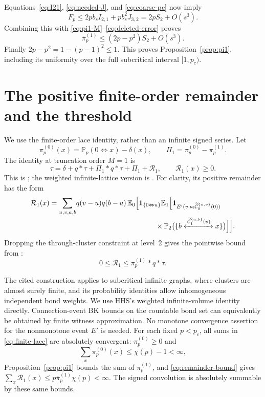 \documentclass[11pt]{article}
\theoremstyle{definition}
\newcommand{\Pp}{\mathbb P_p}
\newcommand{\ind}{\mathbf 1}
\newcommand{\through}[3]{\{#1\xleftrightarrow{\,#3\,}#2\}}
\begin{document}
Equations~\eqref{eq:I21}, \eqref{eq:needed-J}, and
\eqref{eq:coarse-pc} now imply
\[
 F_p\le2p b_s I_{2,1}+p b_s^2J_{3,2}
      =2pS_2+O(s^3).
\]
Combining this with \eqref{eq:pi1-M}--\eqref{eq:deleted-error} proves
\[
 \overline\pi_p^{(1)}\le(2p-p^2)S_2+O(s^3).
\]
Finally $2p-p^2=1-(p-1)^2\le1$. This proves
Proposition~\ref{prop:pi1}, including its uniformity over the full
subcritical interval $[1,p_c)$.

\section{The positive finite-order remainder and the threshold}
\label{sec:threshold}

We use the finite-order lace identity, rather than an infinite signed
series. Let
\[
 \pi_p^{(0)}(x)=\Pp(0\Leftrightarrow x)-\delta(x),\qquad
 \Pi_1=\pi_p^{(0)}-\pi_p^{(1)}.
\]
The identity at truncation order $M=1$ is
\begin{equation}\label{eq:finite-lace}
 \tau=\delta+q*\tau+\Pi_1*q*\tau+\Pi_1+\mathcal R_1,
 \qquad \mathcal R_1(x)\ge0.
\end{equation}
This is \cite[(3.9)--(3.10), (3.32)]{BCHSS2005}; the weighted
infinite-lattice version is \cite[Section~4.2, (4.6)]{HHS2008}.
For clarity, its positive remainder has the form
\begin{align}\label{eq:remainder-positive}
 \mathcal R_1(x)
 =\sum_{u,v,a,b}&q(v-u)q(b-a)\,
 \mathbb E_0\Big[\ind_{\{0\Leftrightarrow u\}}
 \mathbb E_1\Big[\ind_{E'(v,a;\widetilde{\mathcal C}_0^{\{u,v\}}(0))}
 \notag\\[-2pt]
 &\hspace{39mm}\times
 \mathbb P_2\big(\through{b}{x}{\widetilde{\mathcal C}_1^{\{a,b\}}(v)}\big)
 \Big]\Big].
\end{align}
Dropping the through-cluster constraint at level~2 gives the pointwise
bound from \cite[(3.36)]{BCHSS2005}:
\begin{equation}\label{eq:remainder-bound}
 0\le\mathcal R_1\le\pi_p^{(1)}*q*\tau.
\end{equation}

The cited construction applies to subcritical infinite graphs, where
clusters are almost surely finite, and its probability identities allow
inhomogeneous independent bond weights. We use HHS's weighted
infinite-volume identity directly. Connection-event BK bounds on the
countable bond set can equivalently be obtained by finite witness
approximation. No monotone convergence assertion for the nonmonotone
event $E'$ is needed. For each fixed $p<p_c$, all sums in
\eqref{eq:finite-lace} are absolutely convergent: $\pi_p^{(0)}\ge0$ and
\[
 \sum_x\pi_p^{(0)}(x)\le\chi(p)-1<\infty,
\]
Proposition~\ref{prop:pi1} bounds the sum of $\pi_p^{(1)}$, and
\eqref{eq:remainder-bound} gives
$\sum_x\mathcal R_1(x)\le p\overline\pi_p^{(1)}\chi(p)<\infty$.
The signed convolution is absolutely summable by these same bounds.
\end{document}
